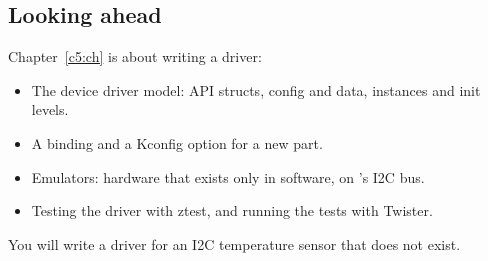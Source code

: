 \subsection*{Looking ahead}
Chapter~\ref{c5:ch} is about writing a driver:

\begin{itemize}
  \item The device driver model: API structs, config and data, instances and init levels.
  \item A binding and a Kconfig option for a new part.
  \item Emulators: hardware that exists only in software, on ’s I2C bus.
  \item Testing the driver with ztest, and running the tests with Twister.
\end{itemize}

You will write a driver for an I2C temperature sensor that does not exist.
